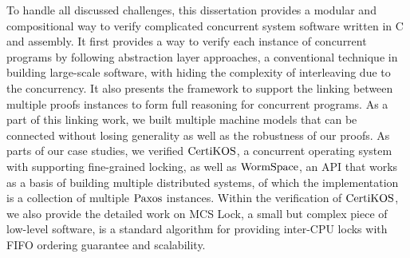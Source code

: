 To handle all discussed challenges,
this dissertation provides a modular and compositional way to verify complicated concurrent system software written in C and assembly.
It first provides a way to verify each instance of concurrent programs by following 
abstraction layer approaches, a conventional technique in building large-scale software,
with hiding the complexity of interleaving due to the concurrency.
It also presents the framework to support the  linking between 
multiple proofs instances to form full reasoning for concurrent programs.
As a part of this linking work, we built multiple machine models that can be connected without losing generality as well as the robustness of our proofs. 
As parts of our case studies, we verified $\mathrm{CertiKOS}$, a concurrent operating system with supporting fine-grained locking,
as well as $\mathrm{WormSpace}$, an API that works as a basis of building multiple distributed systems, of which the implementation is a collection of multiple $\mathrm{Paxos}$ instances.
Within the verification of $\mathrm{CertiKOS}$, we also provide the detailed work on MCS Lock, a small but complex piece of low-level software, is a standard algorithm for providing inter-CPU locks with FIFO ordering guarantee and scalability.



%
%

